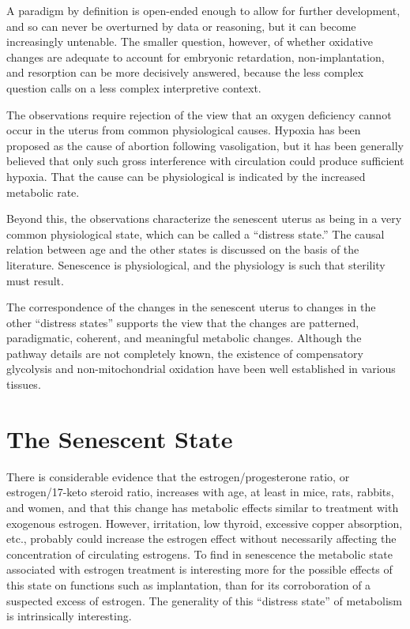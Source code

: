 A paradigm by definition is open-ended enough to allow for further development, and so can never be overturned by data or reasoning, but it can become increasingly untenable. The smaller question, however, of whether oxidative changes are adequate to account for embryonic retardation, non-implantation, and resorption can be more decisively answered, because the less complex question calls on a less complex interpretive context.

The observations require rejection of the view that an oxygen deficiency cannot occur in the uterus from common physiological causes. Hypoxia has been proposed as the cause of abortion following vasoligation, but it has been generally believed that only such gross interference with circulation could produce sufficient hypoxia. That the cause can be physiological is indicated by the increased metabolic rate.

Beyond this, the observations characterize the senescent uterus as being in a very common physiological state, which can be called a ``distress state.'' The causal relation between age and the other states is discussed on the basis of the literature. Senescence is physiological, and the physiology is such that sterility must result.

The correspondence of the changes in the senescent uterus to changes in the other ``distress states'' supports the view that the changes are patterned, paradigmatic, coherent, and meaningful metabolic changes. Although the pathway details are not completely known, the existence of compensatory glycolysis and non-mitochondrial oxidation have been well established in various tissues.

\section{The Senescent State}

There is considerable evidence that the estrogen/progesterone ratio, or estrogen/17-keto steroid ratio, increases with age, at least in mice, rats, rabbits, and women, and that this change has metabolic effects similar to treatment with exogenous estrogen. However, irritation, low thyroid, excessive copper absorption, etc., probably could increase the estrogen effect without necessarily affecting the concentration of circulating estrogens. To find in senescence the metabolic state associated with estrogen treatment is interesting more for the possible effects of this state on functions such as implantation, than for its corroboration of a suspected excess of estrogen. The generality of this ``distress state'' of metabolism is intrinsically interesting.

